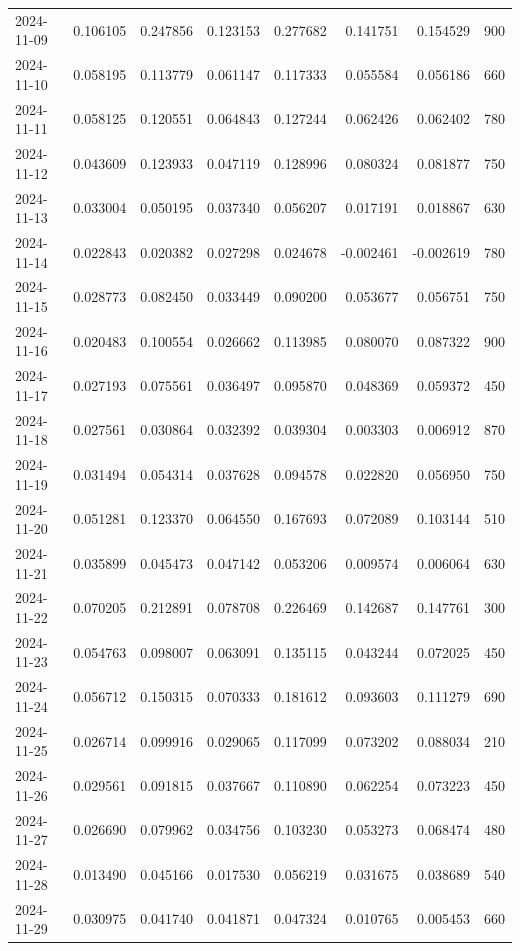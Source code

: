\begin{tabular}{lrrrrrrr}
2024-11-09 & 0.106105 & 0.247856 & 0.123153 & 0.277682 & 0.141751 & 0.154529 & 900 \\
2024-11-10 & 0.058195 & 0.113779 & 0.061147 & 0.117333 & 0.055584 & 0.056186 & 660 \\
2024-11-11 & 0.058125 & 0.120551 & 0.064843 & 0.127244 & 0.062426 & 0.062402 & 780 \\
2024-11-12 & 0.043609 & 0.123933 & 0.047119 & 0.128996 & 0.080324 & 0.081877 & 750 \\
2024-11-13 & 0.033004 & 0.050195 & 0.037340 & 0.056207 & 0.017191 & 0.018867 & 630 \\
2024-11-14 & 0.022843 & 0.020382 & 0.027298 & 0.024678 & -0.002461 & -0.002619 & 780 \\
2024-11-15 & 0.028773 & 0.082450 & 0.033449 & 0.090200 & 0.053677 & 0.056751 & 750 \\
2024-11-16 & 0.020483 & 0.100554 & 0.026662 & 0.113985 & 0.080070 & 0.087322 & 900 \\
2024-11-17 & 0.027193 & 0.075561 & 0.036497 & 0.095870 & 0.048369 & 0.059372 & 450 \\
2024-11-18 & 0.027561 & 0.030864 & 0.032392 & 0.039304 & 0.003303 & 0.006912 & 870 \\
2024-11-19 & 0.031494 & 0.054314 & 0.037628 & 0.094578 & 0.022820 & 0.056950 & 750 \\
2024-11-20 & 0.051281 & 0.123370 & 0.064550 & 0.167693 & 0.072089 & 0.103144 & 510 \\
2024-11-21 & 0.035899 & 0.045473 & 0.047142 & 0.053206 & 0.009574 & 0.006064 & 630 \\
2024-11-22 & 0.070205 & 0.212891 & 0.078708 & 0.226469 & 0.142687 & 0.147761 & 300 \\
2024-11-23 & 0.054763 & 0.098007 & 0.063091 & 0.135115 & 0.043244 & 0.072025 & 450 \\
2024-11-24 & 0.056712 & 0.150315 & 0.070333 & 0.181612 & 0.093603 & 0.111279 & 690 \\
2024-11-25 & 0.026714 & 0.099916 & 0.029065 & 0.117099 & 0.073202 & 0.088034 & 210 \\
2024-11-26 & 0.029561 & 0.091815 & 0.037667 & 0.110890 & 0.062254 & 0.073223 & 450 \\
2024-11-27 & 0.026690 & 0.079962 & 0.034756 & 0.103230 & 0.053273 & 0.068474 & 480 \\
2024-11-28 & 0.013490 & 0.045166 & 0.017530 & 0.056219 & 0.031675 & 0.038689 & 540 \\
2024-11-29 & 0.030975 & 0.041740 & 0.041871 & 0.047324 & 0.010765 & 0.005453 & 660 \\

\end{tabular}
